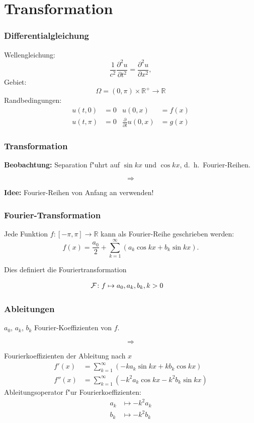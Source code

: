\documentclass{beamer}
\begin{document}
\section{Transformation}

\begin{frame}
\frametitle{Differentialgleichung}

Wellengleichung:
\[
\frac{1}{c^2}
\frac{\partial^2 u}{\partial t^2}
=
\frac{\partial^2 u}{\partial x^2},
\]
Gebiet:
\[
\Omega = (0,\pi)\times \mathbb R^+\to \mathbb R
\]
Randbedingungen:
\begin{align*}
u(t,   0)&= 0&u(0,x)&=f(x)\\
u(t, \pi)&= 0&\frac{\partial}{\partial t}u(0,x)&=g(x)
\end{align*}

\end{frame}

\begin{frame}
\frametitle{Transformation}

{\bf Beobachtung:} Separation f"uhrt auf $\sin kx$ und $\cos kx$,
d.~h.~Fourier-Reihen.

\[
\Rightarrow
\]
\bigskip

{\bf Idee:} Fourier-Reihen von Anfang an verwenden!

\end{frame}

\begin{frame}
\frametitle{Fourier-Transformation}

Jede Funktion $f\colon [-\pi,\pi]\to\mathbb R$ kann als Fourier-Reihe
geschrieben werden:
\[
f(x)=\frac{a_0}{2}+\sum_{k=1}^\infty(a_k\cos kx+b_k\sin kx).
\]

\medskip
\pause
Dies definiert die Fouriertransformation
\medskip

\begin{align*}
{\cal F}\colon
f
&\mapsto
a_0, a_k, b_k, k> 0
\end{align*}

\end{frame}

\begin{frame}
\frametitle{Ableitungen}
$a_0$, $a_k$, $b_k$ Fourier-Koeffizienten von $f$.

\[\Rightarrow\]

Fourierkoeffizienten der Ableitung nach $x$
\begin{align*}
f'(x)&=\sum_{k=1}^\infty (-ka_k\sin kx+kb_k\cos kx)\\
f''(x)&=\sum_{k=1}^\infty (-k^2a_k\cos kx-k^2b_k\sin kx)
\end{align*}
Ableitungsoperator f"ur Fourierkoeffizienten:
\begin{align*}
a_k&\mapsto -k^2a_k\\
b_k&\mapsto -k^2b_k\\
\end{align*}
\end{frame}
\end{document}
